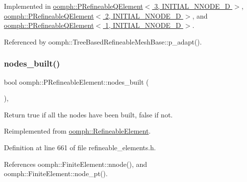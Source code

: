 Implemented in \hyperlink{classoomph_1_1PRefineableQElement_3_013_00_01INITIAL__NNODE__1D_01_4_a6a9ebb8e12fed777e3f704ebd6af2232}{oomph\+::\+P\+Refineable\+Q\+Element$<$ 3, I\+N\+I\+T\+I\+A\+L\+\_\+\+N\+N\+O\+D\+E\+\_\+D $>$}, \hyperlink{classoomph_1_1PRefineableQElement_3_012_00_01INITIAL__NNODE__1D_01_4_af5792fe3ee774090f759b0a7dac6fddc}{oomph\+::\+P\+Refineable\+Q\+Element$<$ 2, I\+N\+I\+T\+I\+A\+L\+\_\+\+N\+N\+O\+D\+E\+\_\+D $>$}, and \hyperlink{classoomph_1_1PRefineableQElement_3_011_00_01INITIAL__NNODE__1D_01_4_a8028c741bb96ca6ad16c188a82a80c9c}{oomph\+::\+P\+Refineable\+Q\+Element$<$ 1, I\+N\+I\+T\+I\+A\+L\+\_\+\+N\+N\+O\+D\+E\+\_\+D $>$}.



Referenced by oomph\+::\+Tree\+Based\+Refineable\+Mesh\+Base\+::p\+\_\+adapt().

\mbox{\label{classoomph_1_1PRefineableElement_a18a6ec4187845d2dbad763ba284ffcc2}} 
\subsubsection{\texorpdfstring{nodes\+\_\+built()}{nodes\_built()}}
{\footnotesize\ttfamily bool oomph\+::\+P\+Refineable\+Element\+::nodes\+\_\+built (\begin{DoxyParamCaption}{ }\end{DoxyParamCaption})\hspace{0.3cm}{\ttfamily [inline]}, {\ttfamily [virtual]}}



Return true if all the nodes have been built, false if not. 



Reimplemented from \hyperlink{classoomph_1_1RefineableElement_a50758228db823d72ea8da23dbb000901}{oomph\+::\+Refineable\+Element}.



Definition at line 661 of file refineable\+\_\+elements.\+h.



References oomph\+::\+Finite\+Element\+::nnode(), and oomph\+::\+Finite\+Element\+::node\+\_\+pt().

\mbox{\label{classoomph_1_1PRefineableElement_a5646a9676ea05f91ca6f6005ee5104c8}} 

